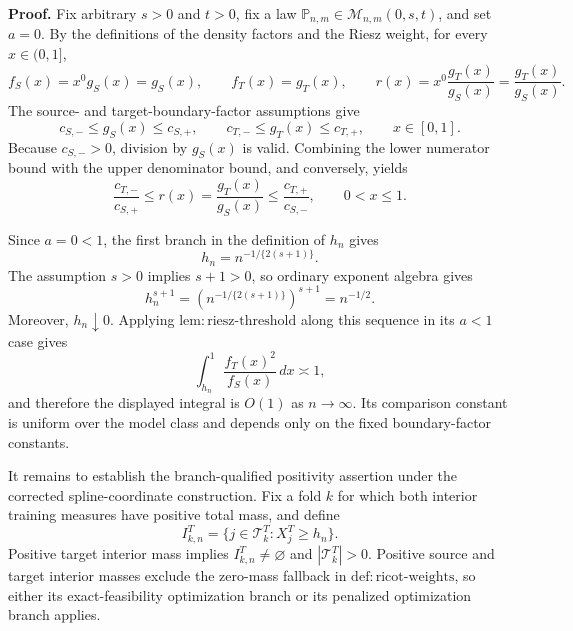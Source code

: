\textbf{Proof.}
Fix arbitrary \(s>0\) and \(t>0\), fix a law \(\mathbb P_{n,m}\in\mathcal M_{n,m}(0,s,t)\), and set \(a=0\). By the definitions of the density factors and the Riesz weight, for every \(x\in(0,1]\),
\[
f_S(x)=x^0g_S(x)=g_S(x),\qquad
f_T(x)=g_T(x),\qquad
r(x)=x^0\frac{g_T(x)}{g_S(x)}=\frac{g_T(x)}{g_S(x)}.
\tag{1}
\]
The source- and target-boundary-factor assumptions give
\[
c_{S,-}\le g_S(x)\le c_{S,+},
\qquad
c_{T,-}\le g_T(x)\le c_{T,+},
\qquad x\in[0,1].
\tag{2}
\]
Because \(c_{S,-}>0\), division by \(g_S(x)\) is valid. Combining the lower numerator bound with the upper denominator bound, and conversely, yields
\[
\frac{c_{T,-}}{c_{S,+}}
\le r(x)=\frac{g_T(x)}{g_S(x)}
\le \frac{c_{T,+}}{c_{S,-}},
\qquad 0<x\le1.
\tag{3}
\]

Since \(a=0<1\), the first branch in the definition of \(h_n\) gives
\[
h_n=n^{-1/\{2(s+1)\}}.
\tag{4}
\]
The assumption \(s>0\) implies \(s+1>0\), so ordinary exponent algebra gives
\[
h_n^{s+1}
=\left(n^{-1/\{2(s+1)\}}\right)^{s+1}
=n^{-1/2}.
\tag{5}
\]
Moreover, \(h_n\downarrow0\). Applying \(\mathrm{lem:riesz\text{-}threshold}\) along this sequence in its \(a<1\) case gives
\[
\int_{h_n}^1\frac{f_T(x)^2}{f_S(x)}\,dx\asymp1,
\tag{6}
\]
and therefore the displayed integral is \(O(1)\) as \(n\to\infty\). Its comparison constant is uniform over the model class and depends only on the fixed boundary-factor constants.

It remains to establish the branch-qualified positivity assertion under the corrected spline-coordinate construction. Fix a fold \(k\) for which both interior training measures have positive total mass, and define
\[
I^T_{k,n}=\{j\in\mathcal T^T_k:X_j^T\ge h_n\}.
\tag{7}
\]
Positive target interior mass implies \(I^T_{k,n}\ne\varnothing\) and \(|\mathcal T^T_k|>0\). Positive source and target interior masses exclude the zero-mass fallback in \(\mathrm{def:ricot\text{-}weights}\), so either its exact-feasibility optimization branch or its penalized optimization branch applies.

